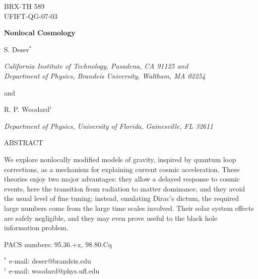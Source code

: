 \documentclass[12pt]{article}
\begin{document}
\begin{titlepage}

\begin{flushright}
BRX-TH 589 \\
UFIFT-QG-07-03
\end{flushright}

\vskip 2cm

\begin{center}
{\bf Nonlocal Cosmology}
\end{center}

\vskip 2cm

\begin{center}
S. Deser$^*$
\end{center}

\begin{center}
\it{California Institute of Technology, Pasadena, CA 91125 and \\
Department of Physics, Brandeis University, Waltham, MA 02254}
\end{center}

\begin{center}
and
\end{center}

\begin{center}
R. P. Woodard$^{\dagger}$
\end{center}

\begin{center}
\it{Department of Physics, University of Florida, Gainesville, FL 32611}
\end{center}

\vspace{1cm}

\begin{center}
ABSTRACT
\end{center}
We explore nonlocally modified models of gravity, inspired by quantum loop
corrections, as a mechanism for explaining current cosmic acceleration. These
theories enjoy two major advantages: they allow a delayed response to cosmic
events, here the transition from radiation to matter dominance, and they avoid
the usual level of fine tuning; instead, emulating Dirac's dictum, the required
large numbers come from the large time scales involved. Their solar system
effects are safely negligible, and they may even prove useful to the black
hole information problem.

\begin{flushleft}
PACS numbers: 95.36.+x, 98.80.Cq
\end{flushleft}

\begin{flushleft}
$^*$ e-mail: deser@brandeis.edu \\
$^{\dagger}$ e-mail: woodard@phys.ufl.edu
\end{flushleft}

\end{titlepage}
\end{document}
